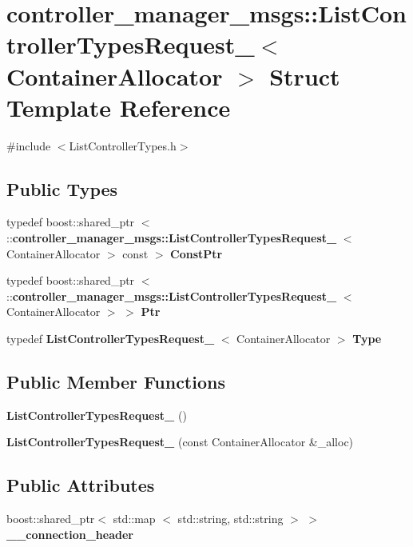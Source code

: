 \section{controller\-\_\-manager\-\_\-msgs\-:\-:\-List\-Controller\-Types\-Request\-\_\-$<$ \-Container\-Allocator $>$ \-Struct \-Template \-Reference}
\label{structcontroller__manager__msgs_1_1ListControllerTypesRequest__}


{\ttfamily \#include $<$\-List\-Controller\-Types.\-h$>$}

\subsection*{\-Public \-Types}
\begin{DoxyCompactItemize}
\item 
typedef boost\-::shared\-\_\-ptr\*
$<$ \-::{\bf controller\-\_\-manager\-\_\-msgs\-::\-List\-Controller\-Types\-Request\-\_\-}\*
$<$ \-Container\-Allocator $>$ const  $>$ {\bf \-Const\-Ptr}
\item 
typedef boost\-::shared\-\_\-ptr\*
$<$ \-::{\bf controller\-\_\-manager\-\_\-msgs\-::\-List\-Controller\-Types\-Request\-\_\-}\*
$<$ \-Container\-Allocator $>$ $>$ {\bf \-Ptr}
\item 
typedef \*
{\bf \-List\-Controller\-Types\-Request\-\_\-}\*
$<$ \-Container\-Allocator $>$ {\bf \-Type}
\end{DoxyCompactItemize}
\subsection*{\-Public \-Member \-Functions}
\begin{DoxyCompactItemize}
\item 
{\bf \-List\-Controller\-Types\-Request\-\_\-} ()
\item 
{\bf \-List\-Controller\-Types\-Request\-\_\-} (const \-Container\-Allocator \&\-\_\-alloc)
\end{DoxyCompactItemize}
\subsection*{\-Public \-Attributes}
\begin{DoxyCompactItemize}
\item 
boost\-::shared\-\_\-ptr$<$ std\-::map\*
$<$ std\-::string, std\-::string $>$ $>$ {\bf \-\_\-\-\_\-connection\-\_\-header}
\end{DoxyCompactItemize}


